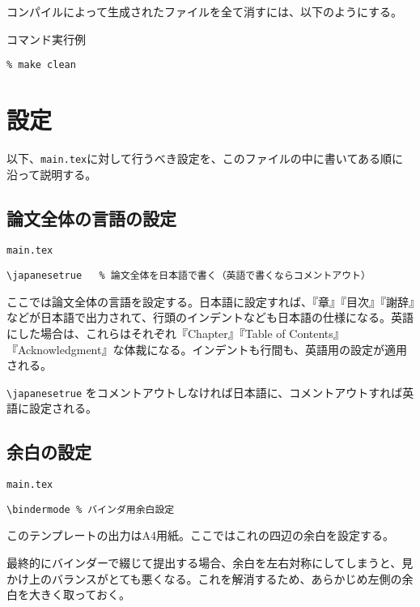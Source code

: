 コンパイルによって生成されたファイルを全て消すには、以下のようにする。

\begin{itembox}[l]{コマンド実行例}
\begin{verbatim}
% make clean
\end{verbatim}
\end{itembox}

\section{設定}

以下、{\tt main.tex}に対して行うべき設定を、このファイルの中に書いてある順に沿って説明する。

\subsection{論文全体の言語の設定}
\label{sec:lang}

\begin{itembox}[l]{{\tt main.tex}}
\begin{verbatim}
\japanesetrue	% 論文全体を日本語で書く（英語で書くならコメントアウト）
\end{verbatim}
\end{itembox}

ここでは論文全体の言語を設定する。日本語に設定すれば、『章』『目次』『謝辞』などが日本語で出力されて、行頭のインデントなども日本語の仕様になる。英語にした場合は、これらはそれぞれ『Chapter』『Table of Contents』『Acknowledgment』な体裁になる。インデントも行間も、英語用の設定が適用される。

\verb|\japanesetrue| をコメントアウトしなければ日本語に、コメントアウトすれば英語に設定される。


\subsection{余白の設定}

\begin{itembox}[l]{{\tt main.tex}}
\begin{verbatim}
\bindermode	% バインダ用余白設定
\end{verbatim}
\end{itembox}

このテンプレートの出力はA4用紙。ここではこれの四辺の余白を設定する。

最終的にバインダーで綴じて提出する場合、余白を左右対称にしてしまうと、見かけ上のバランスがとても悪くなる。これを解消するため、あらかじめ左側の余白を大きく取っておく。

